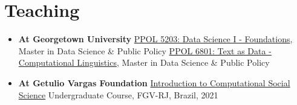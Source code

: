 \documentclass[letterpaper, 11pt]{article}
\begin{document}



\section*{Teaching}

    \begin{itemize}[leftmargin=.45cm]
        \item \textbf{At Georgetown University}
             \subitem \href{https://tiagoventura.github.io/ppol5203/}{PPOL 5203: Data Science I - Foundations}, Master in Data Science \& Public Policy
             \subitem \href{https://tiagoventura.github.io/PPOL_6801/}{PPOL 6801: Text as Data - Computational Linguistics}, Master in Data Science \& Public Policy



         \item \textbf{At Getulio Vargas Foundation }
         \subitem \href{https://fgvintrocss.netlify.app/}{Introduction to Computational Social Science} Undergraduate Course, FGV-RJ, Brazil, 2021
    \end{itemize}
\end{document}
